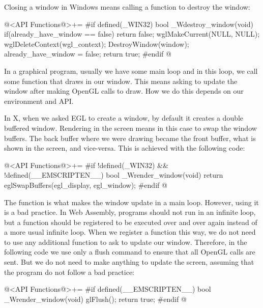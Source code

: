 
Closing a window in Windows means calling a function to destroy the
window:

\iniciocodigo
@<API Functions@>+=
#if defined(_WIN32)
bool _Wdestroy_window(void){
  if(already_have_window == false)
    return false;
  wglMakeCurrent(NULL, NULL);
  wglDeleteContext(wgl_context);
  DestroyWindow(window);
  already_have_window = false;
  return true;
}
#endif
@
\fimcodigo


In a graphical program, usually we have some main loop and in this
loop, we call some function that draws in our window. This means
asking to update the window after making OpenGL calls to draw. How we
do this depends on our environment and API.


In X, when we asked EGL to create a window, by default it creates a
double buffered window. Rendering in the screen means in this case to
swap the window buffers. The back buffer where we were drawing became
the front buffer, what is shown in the screen, and vice-versa. This is
achieved with the following code:

\iniciocodigo
@<API Functions@>+=
#if !defined(_WIN32) && !defined(__EMSCRIPTEN__)
bool _Wrender_window(void){
  return eglSwapBuffers(egl_display, egl_window);
}
#endif
@
\fimcodigo


The function  is what makes the window
update in a main loop. However, using it is a bad practice. In Web
Assembly, programs should not run in an infinite loop, but a function
should be registered to be executed over and over again instead of a
more usual infinite loop. When we register a function this way, we do
not need to use any additional function to ask to update our
window. Therefore, in the following code we use only a flush command
to ensure that all OpenGL calls are sent. But we do not need to make
anything to update the screen, assuming that the program do not follow
a bad practice:

\iniciocodigo
@<API Functions@>+=
#if defined(__EMSCRIPTEN__)
bool _Wrender_window(void){
  glFlush();
  return true;
}
#endif
@
\fimcodigo


